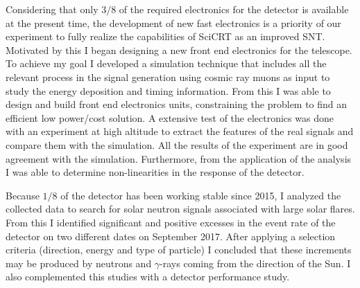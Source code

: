 Considering that only $3/8$ of the required electronics for the detector is available at the present time, the development of new fast electronics is a priority of our experiment to fully realize the capabilities of SciCRT as an improved SNT. Motivated by this I began designing a new front end electronics for the telescope. To achieve my goal I developed a simulation technique that includes all the relevant process in the signal generation using cosmic ray muons as input to study the energy deposition and timing information. From this I was able to design and build front end electronics units, constraining the problem to find an efficient low power/cost solution. A extensive test of the electronics was done with an experiment at high altitude to extract the features of the real signals and compare them with the simulation. All the results of the experiment are in good agreement with the simulation. Furthermore, from the application of the analysis I was able to determine non-linearities in the response of the detector.

Because $1/8$ of the detector has been working stable since \num{2015}, I analyzed the collected data to search for solar neutron signals associated with large solar flares. From this I identified significant and positive excesses in the event rate of the detector on two different dates on September \num{2017}. After applying a selection criteria (direction, energy and type of particle) I concluded that these increments may be produced by neutrons and $\gamma$-rays coming from the direction of the Sun. I also complemented this studies with a detector performance study.

